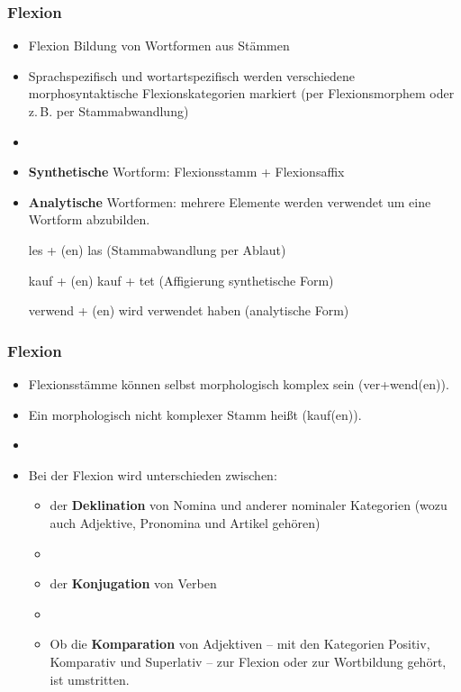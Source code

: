 \begin{frame}
\frametitle{Flexion}

\begin{itemize}
	\item Flexion \ras Bildung von Wortformen aus Stämmen
	\item Sprachspezifisch und wortartspezifisch werden verschiedene morphosyntaktische Flexionskategorien markiert (per Flexionsmorphem oder z.\,B. per Stammabwandlung)
	\item[]
	\item \textbf{Synthetische} Wortform: Flexionsstamm + Flexionsaffix
	\item \textbf{Analytische} Wortformen: mehrere Elemente werden verwendet um eine Wortform abzubilden.
	
	\ea les + (en) \ras las (Stammabwandlung per Ablaut)
	\z
	
	\ea kauf + (en) \ras kauf + tet (Affigierung \ras  synthetische Form)
	\z
	
	\ea verwend + (en) \ras wird verwendet haben (analytische Form)
	\z
	
\end{itemize}


\end{frame}




\begin{frame}
\frametitle{Flexion}

\begin{itemize}
	\item Flexionsstämme können selbst morphologisch komplex sein (ver+wend(en)).
	\item Ein morphologisch nicht komplexer Stamm heißt  (kauf(en)).
	\item[] 
	\item Bei der Flexion wird unterschieden zwischen:
	
	\begin{itemize}
		\item der \textbf{Deklination} von Nomina und anderer nominaler Kategorien (wozu auch Adjektive, Pronomina und Artikel gehören)
		\item[]
		\item der \textbf{Konjugation} von Verben 
		\item[]
		\item Ob die \textbf{Komparation} von Adjektiven -- mit den Kategorien Positiv, Komparativ und Superlativ -- zur Flexion oder zur Wortbildung gehört, ist umstritten.
	\end{itemize}
	
\end{itemize}

\end{frame}



